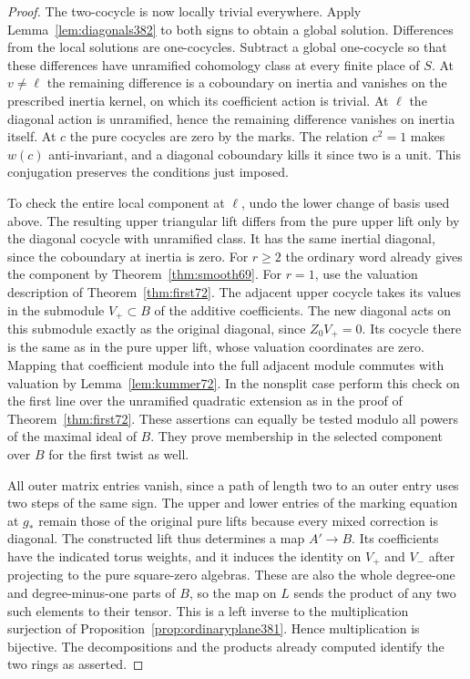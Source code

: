 \documentclass[a4paper,11pt]{article}
\theoremstyle{definition}
\theoremstyle{remark}
\numberwithin{equation}{section}
\begin{document}
\begin{proof}
The two-cocycle is now locally trivial everywhere. Apply
Lemma~\ref{lem:diagonals382} to both signs to obtain a
global solution. Differences from the local solutions are
one-cocycles. Subtract a global one-cocycle so that these
differences have unramified cohomology class at every finite
place of \(S\). At \(v\ne\ell\) the remaining difference is
a coboundary on inertia and vanishes on the prescribed
inertia kernel, on which its coefficient action is trivial.
At \(\ell\) the diagonal action is unramified, hence the
remaining difference vanishes on inertia itself. At \(c\)
the pure cocycles are zero by the marks. The relation
\(c^2=1\) makes \(w(c)\) anti-invariant, and a diagonal
coboundary kills it since two is a unit. This conjugation
preserves the conditions just imposed.

To check the entire local component at \(\ell\), undo the
lower change of basis used above. The resulting upper
triangular lift differs from the pure upper lift only by
the diagonal cocycle with unramified class. It has the same
inertial diagonal, since the coboundary at inertia is zero.
For \(r\ge2\) the ordinary word already gives the component
by Theorem~\ref{thm:smooth69}. For \(r=1\), use the valuation
description of Theorem~\ref{thm:first72}. The adjacent
upper cocycle takes its values in the submodule \(V_+\subset B\)
of the additive coefficients. The new diagonal acts on
this submodule exactly as the original diagonal, since
\(Z_0 V_+=0\). Its cocycle there is the same as in the pure
upper lift, whose valuation coordinates are zero. Mapping
that coefficient module into the full adjacent module
commutes with valuation by Lemma~\ref{lem:kummer72}.
In the nonsplit case perform this check on the first line
over the unramified quadratic extension as in the proof of
Theorem~\ref{thm:first72}. These assertions can equally be
tested modulo all powers of the maximal ideal of \(B\).
They prove membership in the selected component over \(B\)
for the first twist as well.

All outer matrix entries vanish, since a path of length two
to an outer entry uses two steps of the same sign. The upper
and lower entries of the marking equation at \(g_*\) remain
those of the original pure lifts because every mixed correction
is diagonal. The constructed lift thus determines a map
\(A'\to B\). Its coefficients have the indicated torus
weights, and it induces the identity on \(V_+\) and \(V_-\)
after projecting to the pure square-zero algebras. These
are also the whole degree-one and degree-minus-one parts
of \(B\), so the map on \(L\) sends the product of any two
such elements to their tensor. This is a left inverse to
the multiplication surjection of
Proposition~\ref{prop:ordinaryplane381}. Hence multiplication
is bijective. The decompositions and the products already
computed identify the two rings as asserted.
\end{proof}
\end{document}

